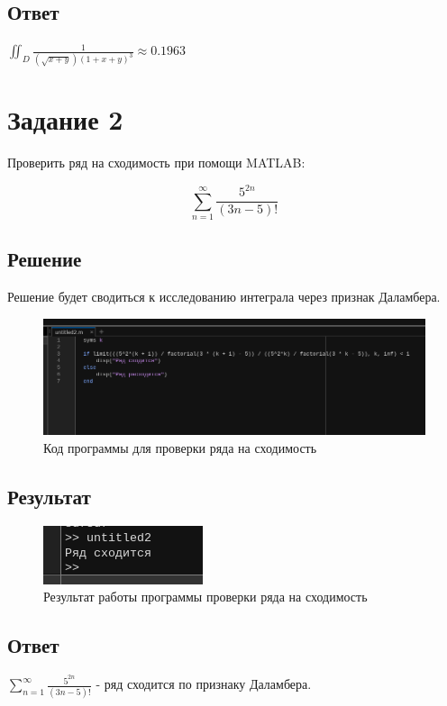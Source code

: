 \documentclass[14pt, a4paper]{article}
\begin{document}
    \subsection*{Ответ}

    $\iint_D { \frac{ 1 } { (\sqrt{x + y}) { (1 + x + y) }^3 }} \approx 0.1963$

    \newpage
    
    \section*{Задание 2}

    Проверить ряд на сходимость при помощи MATLAB:

    \[ \sum_{n=1}^{\infty} \frac{5^{2n}}{(3n - 5)!} \]
    
    \subsection*{Решение}

    Решение будет сводиться к исследованию интеграла через признак Даламбера.

    \begin{figure}[H]
        \centering
        \includegraphics[width=\textwidth]{images/solution_row.png}
        \caption{Код программы для проверки ряда на сходимость}
    \end{figure}

    \subsection*{Результат}

    \begin{figure}[H]
        \centering
        \includegraphics[width=\textwidth]{images/result_row.png}
        \caption{Результат работы программы проверки ряда на сходимость}
    \end{figure}

    \subsection*{Ответ}

    $\sum_{n=1}^{\infty} \frac{5^{2n}}{(3n - 5)!}$ - ряд сходится по признаку Даламбера.
\end{document}
